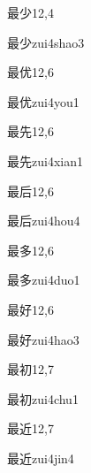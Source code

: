 \begin{entry}{最少}{12,4}
  \begin{phonetics}{最少}{zui4shao3}
  \end{phonetics}
\end{entry}

\begin{entry}{最优}{12,6}
  \begin{phonetics}{最优}{zui4you1}
  \end{phonetics}
\end{entry}

\begin{entry}{最先}{12,6}
  \begin{phonetics}{最先}{zui4xian1}
  \end{phonetics}
\end{entry}

\begin{entry}{最后}{12,6}
  \begin{phonetics}{最后}{zui4hou4}
  \end{phonetics}
\end{entry}

\begin{entry}{最多}{12,6}
  \begin{phonetics}{最多}{zui4duo1}
  \end{phonetics}
\end{entry}

\begin{entry}{最好}{12,6}
  \begin{phonetics}{最好}{zui4hao3}
  \end{phonetics}
\end{entry}

\begin{entry}{最初}{12,7}
  \begin{phonetics}{最初}{zui4chu1}
  \end{phonetics}
\end{entry}

\begin{entry}{最近}{12,7}
  \begin{phonetics}{最近}{zui4jin4}
  \end{phonetics}
\end{entry}

